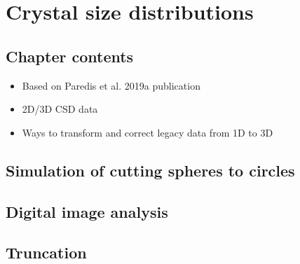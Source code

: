 \chapter{Crystal size distributions}\label{ch:csd}

\section{Chapter contents}
\begin{itemize}
    \item Based on Paredis et al. 2019a publication
    \item 2D/3D CSD data
    \item Ways to transform and correct legacy data from 1D to 3D
\end{itemize}

\section{Simulation of cutting spheres to circles}
\section{Digital image analysis}
\section{Truncation}




\cleardoublepage

